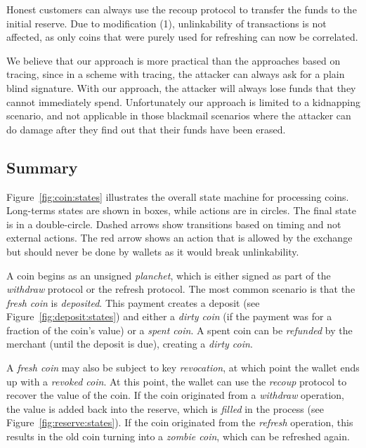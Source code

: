 Honest customers can always use the recoup protocol to transfer the funds to
the initial reserve.  Due to modification (1), unlinkability of transactions is
not affected, as only coins that were purely used for refreshing can now be
correlated.

We believe that our approach is more practical than the approaches based on
tracing, since in a scheme with tracing, the attacker can always ask for a
plain blind signature.  With our approach, the attacker will always lose funds
that they cannot immediately spend.  Unfortunately our approach is limited to a
kidnapping scenario, and not applicable in those blackmail scenarios where the
attacker can do damage after they find out that their funds have been erased.

\subsection{Summary}

Figure~\ref{fig:coin:states} illustrates the overall state machine for processing
coins.  Long-terms states are shown in boxes, while actions are in circles.
The final state is in a double-circle.  Dashed arrows show transitions based
on timing and not external actions. The red arrow shows an action that is
allowed by the exchange but should never be done by wallets as it would
break unlinkability.

A coin begins as an unsigned {\em planchet}, which is either signed as part of
the {\em withdraw} protocol or the refresh protocol. The most common scenario
is that the {\em fresh coin} is {\em deposited}. This payment creates a
deposit (see Figure~\ref{fig:deposit:states}) and either a {\em dirty coin}
(if the payment was for a fraction of the coin's value) or a {\em spent coin}.
A spent coin can be {\em refunded} by the merchant (until the deposit is due),
creating a {\em dirty coin}.

A {\em fresh coin} may also be subject to key {\em revocation}, at which point
the wallet ends up with a {\em revoked coin}.  At this point, the wallet can
use the {\em recoup} protocol to recover the value of the coin.  If the coin
originated from a {\em withdraw} operation, the value is added back into the
reserve, which is {\em filled} in the process (see
Figure~\ref{fig:reserve:states}).  If the coin originated from the {\em
  refresh} operation, this results in the old coin turning into a {\em zombie
  coin}, which can be refreshed again.


